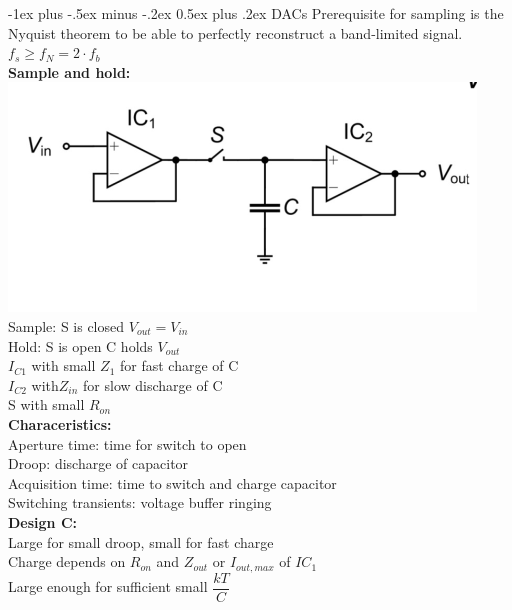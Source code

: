 \documentclass[5pt]{article}
\makeatletter
\renewcommand{\section}{\@startsection{section}{1}{0mm}%
                                {-1ex plus -.5ex minus -.2ex}%
                                {0.5ex plus .2ex}%
                                {\normalfont\large\bfseries}}
\makeatother
\begin{document}
\begin{multicols*}{4}
\section{DACs}
Prerequisite for sampling is the Nyquist theorem to be able to perfectly reconstruct a band-limited signal. $ f_s \geq f_N = 2 \cdot f_b $\\
\textbf{Sample and hold:}\\
\includegraphics[width=0.9\columnwidth]{images/sample_and_hold.png}\\
Sample: S is closed $ V_{out} = V_{in} $\\
Hold: S is open C holds $ V_{out} $\\
$ I_{C1} $ with small $ Z_1 $ for fast charge of C\\
$ I_{C2} $ with$ Z_{in}  $ for slow discharge of C\\
S with small $ R_{on} $\\
\textbf{Characeristics:}\\
Aperture time: time for switch to open\\
Droop: discharge of capacitor\\
Acquisition time: time to switch and charge capacitor\\
Switching transients: voltage buffer ringing\\
\textbf{Design C:}\\
Large for small droop, small for fast charge\\
Charge depends on $ R_{on} $ and $ Z_{out} $ or $ I_{out,max} $ of $ IC_1 $\\
Large enough for sufficient small $ \dfrac{kT}{C} $

\end{multicols*}
\end{document}
